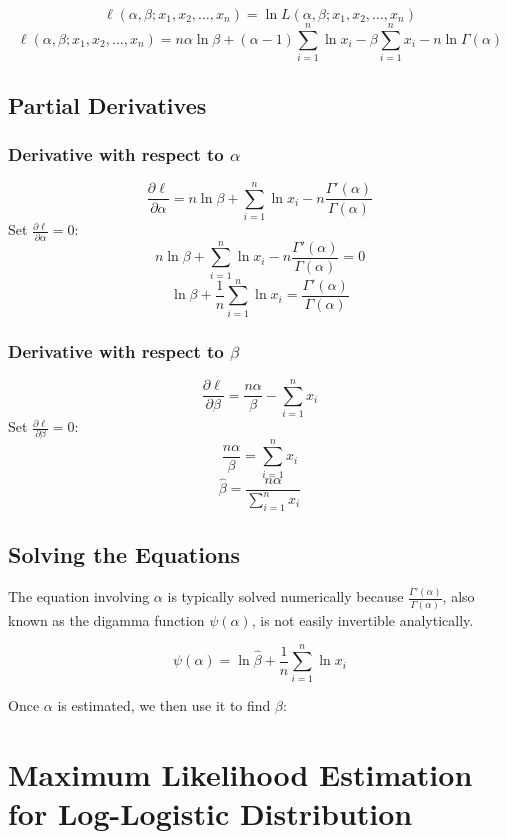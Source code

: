 \documentclass{article}
\begin{document}
\[
\ell(\alpha, \beta; x_1, x_2, \ldots, x_n) = \ln L(\alpha, \beta; x_1, x_2, \ldots, x_n)
\]
\[
\ell(\alpha, \beta; x_1, x_2, \ldots, x_n) = n\alpha \ln \beta + (\alpha-1) \sum_{i=1}^{n} \ln x_i - \beta \sum_{i=1}^{n} x_i - n \ln \Gamma(\alpha)
\]

\subsection*{Partial Derivatives}

\subsubsection*{Derivative with respect to $\alpha$}

\[
\frac{\partial \ell}{\partial \alpha} = n \ln \beta + \sum_{i=1}^{n} \ln x_i - n \frac{\Gamma'(\alpha)}{\Gamma(\alpha)}
\]
Set $\frac{\partial \ell}{\partial \alpha} = 0$:
\[
n \ln \beta + \sum_{i=1}^{n} \ln x_i - n \frac{\Gamma'(\alpha)}{\Gamma(\alpha)} = 0
\]
\[
\ln \beta + \frac{1}{n} \sum_{i=1}^{n} \ln x_i = \frac{\Gamma'(\alpha)}{\Gamma(\alpha)}
\]

\subsubsection*{Derivative with respect to $\beta$}

\[
\frac{\partial \ell}{\partial \beta} = \frac{n\alpha}{\beta} - \sum_{i=1}^{n} x_i
\]
Set $\frac{\partial \ell}{\partial \beta} = 0$:
\[
\frac{n\alpha}{\beta} = \sum_{i=1}^{n} x_i
\]
\[
\hat{\beta} = \frac{n\alpha}{\sum_{i=1}^{n} x_i}
\]

\subsection*{Solving the Equations}

The equation involving $\alpha$ is typically solved numerically because $\frac{\Gamma'(\alpha)}{\Gamma(\alpha)}$, also known as the digamma function $\psi(\alpha)$, is not easily invertible analytically. 

\[
\psi(\alpha) = \ln \hat{\beta} + \frac{1}{n} \sum_{i=1}^{n} \ln x_i
\]

Once $\alpha$ is estimated, we then use it to find $\beta$:



\section*{Maximum Likelihood Estimation for Log-Logistic Distribution}
\end{document}
